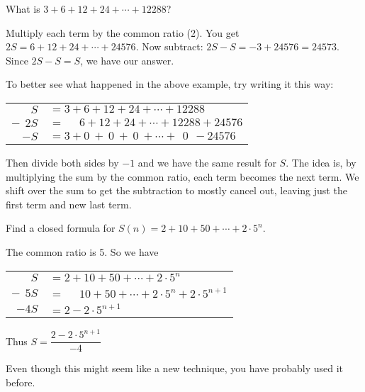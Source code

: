 \documentclass[12pt]{article}
\begin{document}
\begin{example} What is $3 + 6 + 12 + 24 + \cdots + 12288$? 
\begin{solution}
  Multiply each term by the common ratio (2).  You get $2S = 6 + 12 + 24 + \cdots + 24576$.   Now subtract: $2S - S = -3 + 24576 = 24573$.  Since $2S - S = S$, we have our answer. 
  \end{solution}
\end{example} 

To better see what happened in the above example, try writing it this way:

\begin{center}
\begin{tabular}{rl}
  $S $& $= 3 + 6 + 12 + 24 + \cdots + 12288$ \\
 $-~~2S$ & $= ~~~~~~6 + 12 + 24 + \cdots + 12288 + 24576 $\\ \hline
 $-S$ &$ = 3 + 0 ~+~ 0 ~+~ 0 ~ +  \cdots + ~~0 ~~ - 24576$
\end{tabular}
\end{center}

Then divide both sides by $-1$ and we have the same result for $S$.  The idea is, by multiplying the sum by the common ratio, each term becomes the next term.  We shift over the sum to get the subtraction to mostly cancel out, leaving just the first term and new last term.

\begin{example}
  Find a closed formula for $S(n) = 2 + 10 + 50 + \cdots + 2\cdot 5^n$.
  \begin{solution}
    The common ratio is 5.  So we have
    
    \begin{center}
\begin{tabular}{rl}
  $S $& $= 2 + 10 + 50 + \cdots + 2\cdot 5^n$ \\
 $-~~5S$ & $= ~~~~~~10 + 50 + \cdots + 2\cdot 5^n + 2\cdot5^{n+1} $\\ \hline
 $-4S$ &$ = 2  - 2\cdot5^{n+1}$
\end{tabular}
\end{center}

Thus $S = \dfrac{2-2\cdot 5^{n+1}}{-4}$
  \end{solution}
\end{example}

Even though this might seem like a new technique, you have probably used it before.  
\end{document}
